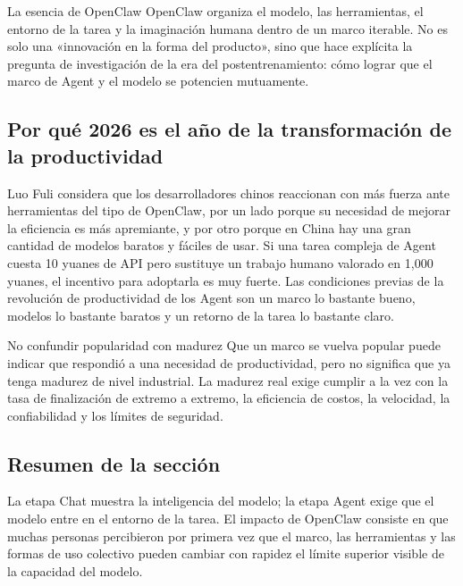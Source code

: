 \begin{importantbox}{La esencia de OpenClaw}
OpenClaw organiza el modelo, las herramientas, el entorno de la tarea y la imaginación humana dentro de un marco iterable. No es solo una «innovación en la forma del producto», sino que hace explícita la pregunta de investigación de la era del postentrenamiento: cómo lograr que el marco de Agent y el modelo se potencien mutuamente.
\end{importantbox}

\subsection{Por qué 2026 es el año de la transformación de la productividad}

Luo Fuli considera que los desarrolladores chinos reaccionan con más fuerza ante herramientas del tipo de OpenClaw, por un lado porque su necesidad de mejorar la eficiencia es más apremiante, y por otro porque en China hay una gran cantidad de modelos baratos y fáciles de usar. Si una tarea compleja de Agent cuesta 10 yuanes de API pero sustituye un trabajo humano valorado en 1,000 yuanes, el incentivo para adoptarla es muy fuerte. Las condiciones previas de la revolución de productividad de los Agent son un marco lo bastante bueno, modelos lo bastante baratos y un retorno de la tarea lo bastante claro.

\begin{warningbox}{No confundir popularidad con madurez}
Que un marco se vuelva popular puede indicar que respondió a una necesidad de productividad, pero no significa que ya tenga madurez de nivel industrial. La madurez real exige cumplir a la vez con la tasa de finalización de extremo a extremo, la eficiencia de costos, la velocidad, la confiabilidad y los límites de seguridad.
\end{warningbox}

\subsection{Resumen de la sección}

La etapa Chat muestra la inteligencia del modelo; la etapa Agent exige que el modelo entre en el entorno de la tarea. El impacto de OpenClaw consiste en que muchas personas percibieron por primera vez que el marco, las herramientas y las formas de uso colectivo pueden cambiar con rapidez el límite superior visible de la capacidad del modelo.
